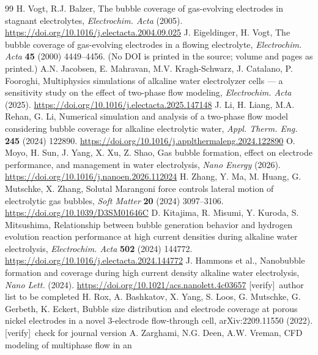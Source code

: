 \documentclass[11pt,a4paper]{article}
\newcommand{\verifyc}{\textcolor{brick}{\footnotesize[verify]}}
\begin{document}
\begin{thebibliography}{99}\small
{} H. Vogt, R.J. Balzer, The bubble coverage of gas-evolving electrodes in stagnant
electrolytes, \emph{Electrochim. Acta} (2005). \url{https://doi.org/10.1016/j.electacta.2004.09.025}
 J. Eigeldinger, H. Vogt, The bubble coverage of gas-evolving electrodes in
a flowing electrolyte, \emph{Electrochim. Acta} \textbf{45} (2000) 4449--4456. (No DOI is printed in
the source; volume and pages as printed.)
 A.N. Jacobsen, E. Mahravan, M.V. Kragh-Schwarz, J. Catalano, P. Fooroghi,
Multiphysics simulations of alkaline water electrolyzer cells --- a sensitivity study on the effect
of two-phase flow modeling, \emph{Electrochim. Acta} (2025).
\url{https://doi.org/10.1016/j.electacta.2025.147148}
 J. Li, H. Liang, M.A. Rehan, G. Li, Numerical simulation and analysis of a two-phase
flow model considering bubble coverage for alkaline electrolytic water, \emph{Appl. Therm. Eng.}
\textbf{245} (2024) 122890. \url{https://doi.org/10.1016/j.applthermaleng.2024.122890}
 O. Moyo, H. Sun, J. Yang, X. Xu, Z. Shao, Gas bubble formation, effect on
electrode performance, and management in water electrolysis, \emph{Nano Energy} (2026).
\url{https://doi.org/10.1016/j.nanoen.2026.112024}
 H. Zhang, Y. Ma, M. Huang, G. Mutschke, X. Zhang, Solutal Marangoni force
controls lateral motion of electrolytic gas bubbles, \emph{Soft Matter} \textbf{20} (2024)
3097--3106. \url{https://doi.org/10.1039/D3SM01646C}
 D. Kitajima, R. Misumi, Y. Kuroda, S. Mitsushima, Relationship between bubble
generation behavior and hydrogen evolution reaction performance at high current densities during
alkaline water electrolysis, \emph{Electrochim. Acta} \textbf{502} (2024) 144772.
\url{https://doi.org/10.1016/j.electacta.2024.144772}
 J. Hammons et al., Nanobubble formation and coverage during high current
density alkaline water electrolysis, \emph{Nano Lett.} (2024).
\url{https://doi.org/10.1021/acs.nanolett.4c03657} \verifyc\ author list to be completed
 H. Rox, A. Bashkatov, X. Yang, S. Loos, G. Mutschke, G. Gerbeth, K. Eckert, Bubble
size distribution and electrode coverage at porous nickel electrodes in a novel 3-electrode
flow-through cell, arXiv:2209.11550 (2022). \verifyc\ check for journal version
 A. Zarghami, N.G. Deen, A.W. Vreman, CFD modeling of multiphase flow in an

\end{thebibliography}
\end{document}
